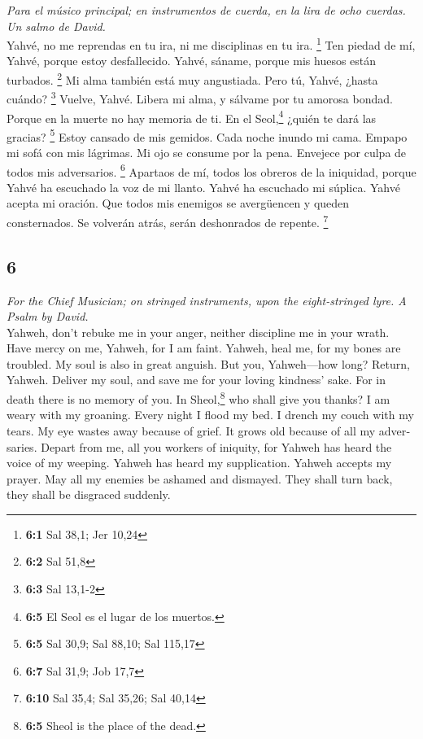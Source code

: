 \begin{paracol}{2}
\emph{Para el músico principal; en instrumentos de cuerda, en la lira de
ocho cuerdas. Un salmo de David.}\\
 Yahvé, no me reprendas en tu ira, ni me disciplinas en tu
ira. \footnote{\textbf{6:1} Sal 38,1; Jer 10,24}  Ten
piedad de mí, Yahvé, porque estoy desfallecido. Yahvé, sáname, porque
mis huesos están turbados. \footnote{\textbf{6:2} Sal 51,8}
 Mi alma también está muy angustiada. Pero tú, Yahvé,
¿hasta cuándo? \footnote{\textbf{6:3} Sal 13,1-2}  Vuelve,
Yahvé. Libera mi alma, y sálvame por tu amorosa bondad. 
Porque en la muerte no hay memoria de ti. En el Seol,\footnote{\textbf{6:5}
  El Seol es el lugar de los muertos.} ¿quién te dará las gracias?
\footnote{\textbf{6:5} Sal 30,9; Sal 88,10; Sal 115,17} 
Estoy cansado de mis gemidos. Cada noche inundo mi cama. Empapo mi sofá
con mis lágrimas.  Mi ojo se consume por la pena. Envejece
por culpa de todos mis adversarios. \footnote{\textbf{6:7} Sal 31,9; Job
  17,7}  Apartaos de mí, todos los obreros de la
iniquidad, porque Yahvé ha escuchado la voz de mi llanto. 
Yahvé ha escuchado mi súplica. Yahvé acepta mi oración. 
Que todos mis enemigos se avergüencen y queden consternados. Se volverán
atrás, serán deshonrados de repente. \footnote{\textbf{6:10} Sal 35,4;
  Sal 35,26; Sal 40,14}

\switchcolumn
\begin{otherlanguage}{english}

\hypertarget{section-11}{%
\section{6}\label{section-11}}

\emph{For the Chief Musician; on stringed instruments, upon the
eight-stringed lyre. A Psalm by David.}\\
 Yahweh, don't rebuke me in your anger, neither discipline
me in your wrath.  Have mercy on me, Yahweh, for I am
faint. Yahweh, heal me, for my bones are troubled.  My
soul is also in great anguish. But you, Yahweh---how long?
 Return, Yahweh. Deliver my soul, and save me for your
loving kindness' sake.  For in death there is no memory of
you. In Sheol,\footnote{\textbf{6:5} Sheol is the place of the dead.}
who shall give you thanks?  I am weary with my groaning.
Every night I flood my bed. I drench my couch with my tears.
 My eye wastes away because of grief. It grows old because
of all my adversaries.  Depart from me, all you workers of
iniquity, for Yahweh has heard the voice of my weeping. 
Yahweh has heard my supplication. Yahweh accepts my prayer.
 May all my enemies be ashamed and dismayed. They shall
turn back, they shall be disgraced suddenly.


\end{otherlanguage}
\end{paracol}
